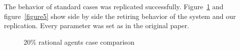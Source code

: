 \documentclass[runningheads,a4paper]{llncs}
\begin{document}
The behavior of standard cases was replicated successfully.
Figure~\ref{figure4} and figure~\ref{figure5} show side by side the retiring behavior of the system and our replication.
Every parameter was set as in the original paper.

\begin{figure}
\centering

\caption{20\% rational agents case comparison}
\label{figure4}
\end{figure}
\end{document}

